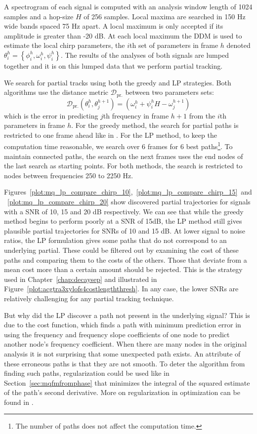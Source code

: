 A spectrogram of each signal is computed with an analysis window length of 1024
samples and a hop-size $H$ of 256 samples. Local maxima are searched in 150 Hz
wide bands spaced 75 Hz apart. A local maximum is only accepted if its amplitude
is greater than -20 dB. At each local maximum the DDM is used to estimate the
local chirp parameters, the $i$th set of parameters in frame $h$ denoted
$\theta_{i}^{h} = \left\{ \phi_{i}^{h} , \omega_{i}^{h} , \psi_{i}^{h}
\right\}$. The results of the analyses of both signals are lumped together and
it is on this lumped data that we perform partial tracking.

We search for partial tracks using both the greedy and LP strategies. Both
algorithms use the distance metric $\mathcal{D}_{\text{pr.}}$ between two parameters sets:
\[
    \mathcal{D}_{\text{pr.}} \left( \theta_{i}^{h},
    \theta_{j}^{h+1} \right) = \left( \omega_{i}^{h} +
    \psi_{i}^{h} H - \omega_{j}^{h+1} \right)
\]
which is the error in predicting $j$th frequency in frame $h+1$ from the $i$th
parameters in frame $h$. For the greedy method, the search for partial paths is
restricted to one frame ahead like in \cite{mcaulay1986speech}. For the LP
method, to keep the computation time reasonable, we search over 6 frames for 6
best paths\footnote{The number of paths does not affect the computation time.}.
To maintain connected paths, the search on the next frames uses the end nodes of
the last search as starting points. For both methods, the search is restricted
to nodes between frequencies 250 to 2250 Hz.

Figures~\ref{plot:mq_lp_compare_chirp_10},~\ref{plot:mq_lp_compare_chirp_15}~and~\ref{plot:mq_lp_compare_chirp_20}
show discovered partial trajectories for signals with a SNR of 10, 15 and 20 dB
respectively. We can see that while the greedy method begins to perform poorly
at a SNR of 15dB, the LP method still gives plausible partial trajectories for
SNRs of 10 and 15 dB. At lower signal to noise ratios, the LP formulation gives
some paths that do not correspond to an underlying partial. These could be filtered
out by examining the cost of these paths and comparing them to the costs of the
others. Those that deviate from a mean cost more than a certain amount should be
rejected. This is the strategy used in Chapter~\ref{chap:decaysep} and
illustrated in Figure~\ref{plot:acgtra3xylofs4costlengththresh}. In any case,
the lower SNRs are relatively challenging for any partial tracking technique.

But why did the LP discover a path not present in the underlying signal? This is
due to the cost function, which finds a path with minimum prediction error in
using the frequency and frequency slope coefficients of one node to predict
another node's frequency coefficient. When there are many nodes in the original
analysis it is not surprising that some unexpected path exists.  An attribute of
these erroneous paths is that they are not smooth. To deter the algorithm from
finding such paths, regularization could be used like in
Section~\ref{sec:mqfmfromphase} that minimizes the integral of the squared
estimate of the path's second derivative. More on regularization in optimization
can be found in \cite[ch.~6.3]{boyd2004convex}.

